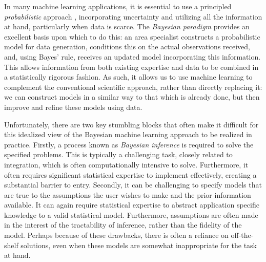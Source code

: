 In many machine learning applications, it is essential to use a principled \emph{probabilistic} 
approach \cite{ghahramani2015probabilistic}, incorporating uncertainty and utilizing all the information at hand, 
particularly when data is scarce.  The \emph{Bayesian paradigm} provides an excellent basis upon which to do this: an area 
specialist constructs a probabilistic model for data generation, conditions this on the actual observations received, 
and, using Bayes' rule, receives an updated model incorporating this information.  This
allows information from both existing expertise and data to be combined in a statistically
rigorous fashion.  As such, it allows us to use machine learning to complement the conventional
scientific approach, rather than directly replacing it: we can construct models in a similar way to
that which is already done, but then improve and refine these models using data.

Unfortunately, there are two key stumbling blocks that often make it difficult for this idealized
view of the Bayesian machine learning approach to be realized in practice.  Firstly, a process 
known as \emph{Bayesian inference} is
required to solve the specified problems.  This is typically a challenging task, closely 
related to integration, which is often computationally intensive to solve.  Furthermore, it often
requires significant statistical expertise to implement effectively, creating a substantial barrier to
entry.  
Secondly, it can be challenging to specify models that are true to the assumptions the user
wishes to make and the prior information available.  It can again require statistical expertise to abstract
application specific knowledge to a valid statistical model.  Furthermore, assumptions are often made in the interest
of the tractability of inference, rather than the fidelity of the model.  Perhaps because of these drawbacks, there is often
a reliance on off-the-shelf solutions, even when these models are somewhat inappropriate for the task
at hand.


